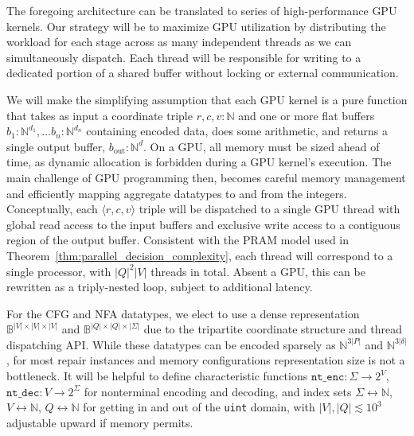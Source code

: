 \documentclass[sigplan,review,acmsmall,nonacm,screen,anonymous]{acmart}\settopmatter{printfolios=false,printccs=false,printacmref=false}
\begin{document}
The foregoing architecture can be translated to series of high-performance GPU kernels. Our strategy will be to maximize GPU utilization by distributing the workload for each stage across as many independent threads as we can simultaneously dispatch. Each thread will be responsible for writing to a dedicated portion of a shared buffer without locking or external communication.

We will make the simplifying assumption that each GPU kernel is a pure function that takes as input a coordinate triple $r, c, v: \mathbb{N}$ and one or more flat buffers $b_1: \mathbb{N}^{d_1}, \ldots b_n: \mathbb{N}^{d_n}$ containing encoded data, does some arithmetic, and returns a single output buffer, $b_{\text{out}}: \mathbb{N}^{d}$. On a GPU, all memory must be sized ahead of time, as dynamic allocation is forbidden during a GPU kernel's execution. The main challenge of GPU programming then, becomes careful memory management and efficiently mapping aggregate datatypes to and from the integers. Conceptually, each $\langle r, c, v\rangle$ triple will be dispatched to a single GPU thread with global read access to the input buffers and exclusive write access to a contiguous region of the output buffer. Consistent with the PRAM model used in Theorem~\ref{thm:parallel_decision_complexity}, each thread will correspond to a single processor, with $|Q|^2|V|$ threads in total. Absent a GPU, this can be rewritten as a triply-nested loop, subject to additional latency.

For the CFG and NFA datatypes, we elect to use a dense representation $\mathbb{B}^{|V|\times|V|\times|V|}$ and $\mathbb{B}^{|Q|\times|Q|\times |\Sigma|}$ due to the tripartite coordinate structure and thread dispatching API. While these datatypes can be encoded sparsely as $\mathbb{N}^{3|P|}$ and $\mathbb{N}^{3|\delta|}$, for most repair instances and memory configurations representation size is not a bottleneck. It will be helpful to define characteristic functions $\texttt{nt\_enc}: \Sigma \rightarrow 2^V$, $\texttt{nt\_dec}: V \rightarrow 2^\Sigma$ for nonterminal encoding and decoding, and index sets $\Sigma \leftrightarrow \mathbb{N}$, $V \leftrightarrow \mathbb{N}$, $Q \leftrightarrow \mathbb{N}$ for getting in and out of the \texttt{uint} domain, with $|V|, |Q| \lesssim 10^3$ adjustable upward if memory permits.
\end{document}
